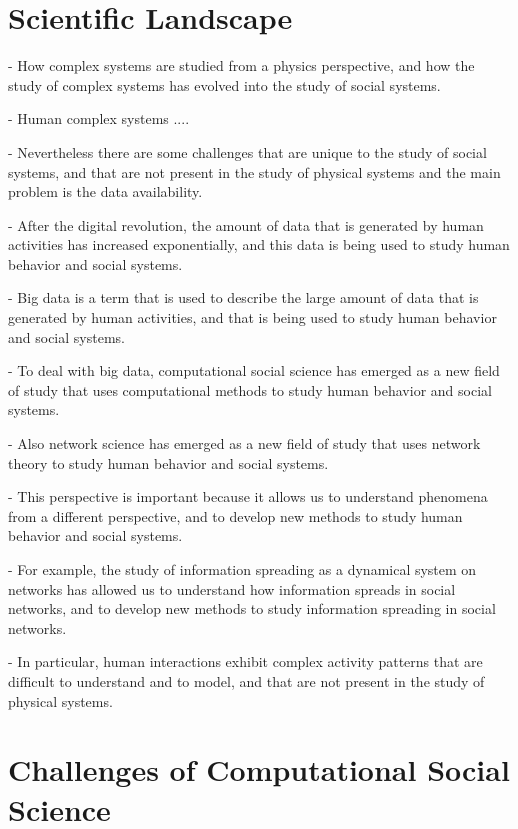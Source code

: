 \setcounter{page}{1}

\section{\label{sec:scie_lands} Scientific Landscape}

- How complex systems are studied from a physics perspective, and how the study of complex systems has evolved into the study of social systems.

- Human complex systems ....

- Nevertheless there are some challenges that are unique to the study of social systems, and that are not present in the study of physical systems and the main problem is the data availability.

- After the digital revolution, the amount of data that is generated by human activities has increased exponentially, and this data is being used to study human behavior and social systems. 

- Big data is a term that is used to describe the large amount of data that is generated by human activities, and that is being used to study human behavior and social systems.

- To deal with big data, computational social science has emerged as a new field of study that uses computational methods to study human behavior and social systems.

- Also network science has emerged as a new field of study that uses network theory to study human behavior and social systems.

- This perspective is important because it allows us to understand phenomena from a different perspective, and to develop new methods to study human behavior and social systems. 

- For example, the study of information spreading as a dynamical system on networks has allowed us to understand how information spreads in social networks, and to develop new methods to study information spreading in social networks.

- In particular, human interactions exhibit complex activity patterns that are difficult to understand and to model, and that are not present in the study of physical systems.

\section{\label{sec:Challenges of Computational Social Science} Challenges of Computational Social Science}

